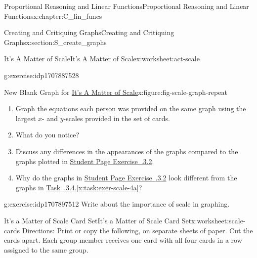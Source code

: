 \documentclass[oneside,10pt,]{book}
\newcommand{\xreffont}{\relax}
\numberwithin{equation}{chapter}
\begin{document}
\begin{chapterptx}{Proportional Reasoning and Linear Functions}{}{Proportional Reasoning and Linear Functions}{}{}{x:chapter:C_lin_funcs}
\begin{sectionptx}{Creating and Critiquing Graphs}{}{Creating and Critiquing Graphs}{}{}{x:section:S_create_graphs}
\begin{worksheet-subsection}{It's A Matter of Scale}{}{It's A Matter of Scale}{}{}{x:worksheet:act-scale}
\begin{divisionexercise}{4}{}{}{g:exercise:idp1707887528}
\begin{figureptx}{New Blank Graph for \hyperref[x:worksheet:act-scale]{It's A Matter of Scale}}{x:figure:fig-scale-graph-repeat}{}
\begin{image}{0.15}{0.7}{0.15}
\end{image}%
\tcblower
\end{figureptx}%
\begin{enumerate}[font=\bfseries,label=(\alph*),ref=\alph*]
\item\label{x:task:exer-scale-4a}Graph the equations each person was provided on the same graph using the largest \(x\)- and \(y\)-scales provided in the set of cards.%
\item{}What do you notice?%
\item{}Discuss any differences in the appearances of the graphs compared to the graphs plotted in \hyperlink{x:exercise:exer-scale-2}{Student Page Exercise~{\xreffont 2.2.3.2}}.%
\item{}Why do the graphs in \hyperlink{x:exercise:exer-scale-2}{Student Page Exercise~{\xreffont 2.2.3.2}} look different from the graphs in \hyperref[x:task:exer-scale-4a]{Task~{\xreffont 2.2.3.4}.{\xreffont\ref{x:task:exer-scale-4a}}}?%
\end{enumerate}
\end{divisionexercise}%
\begin{divisionexercise}{5}{}{}{g:exercise:idp1707897512}%
Write about the importance of scale in graphing.%
\end{divisionexercise}%
\end{worksheet-subsection}
\restoregeometry
%
%
\typeout{************************************************}
\typeout{************************************************}
%
\begin{worksheet-subsection}{It's a Matter of Scale Card Set}{}{It's a Matter of Scale Card Set}{}{}{x:worksheet:scale-cards}
Directions: Print or copy the following, on separate sheets of paper. Cut the cards apart. Each group member receives one card with all four cards in a row assigned to the same group.%
\begin{image}{0}{1}{0}%

\end{image}
\end{worksheet-subsection}
\end{sectionptx}
\end{chapterptx}
\end{document}
